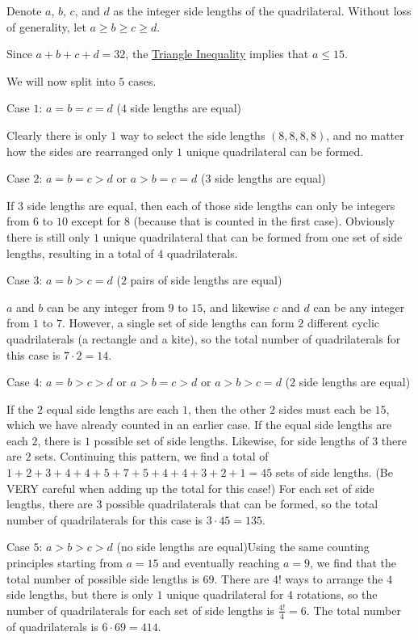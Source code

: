 \begin{enumerate}
 Denote $a$, $b$, $c$, and $d$ as the integer side lengths of the quadrilateral. Without loss of generality, let $a\ge b \ge c \ge d$.

 Since $a+b+c+d = 32$, the \href{https://artofproblemsolving.com/wiki/index.php?title=Triangle\_Inequality}{Triangle Inequality} implies that $a \le 15$.

 
We will now split into $5$ cases.

 
Case $1$: $a = b = c = d$ ($4$ side lengths are equal)

 Clearly there is only $1$ way to select the side lengths $(8,8,8,8)$, and no matter how the sides are rearranged only $1$ unique quadrilateral can be formed.

 Case $2$: $a = b = c > d$ or $a > b = c = d$ ($3$ side lengths are equal)

 If $3$ side lengths are equal, then each of those side lengths can only be integers from $6$ to $10$ except for $8$ (because that is counted in the first case). Obviously there is still only $1$ unique quadrilateral that can be formed from one set of side lengths, resulting in a total of $4$ quadrilaterals.

 Case $3$: $a = b > c = d$ ($2$ pairs of side lengths are equal)

 $a$ and $b$ can be any integer from $9$ to $15$, and likewise $c$ and $d$ can be any integer from $1$ to $7$. However, a single set of side lengths can form $2$ different cyclic quadrilaterals (a rectangle and a kite), so the total number of quadrilaterals for this case is $7\cdot{2} = 14$.

 Case $4$: $a = b > c > d$ or $a > b = c > d$ or $a > b > c = d$ ($2$ side lengths are equal)

 If the $2$ equal side lengths are each $1$, then the other $2$ sides must each be $15$, which we have already counted in an earlier case. If the equal side lengths are each $2$, there is $1$ possible set of side lengths. Likewise, for side lengths of $3$ there are $2$ sets. Continuing this pattern, we find a total of $1+2+3+4+4+5+7+5+4+4+3+2+1 = 45$ sets of side lengths. (Be VERY careful when adding up the total for this case!) For each set of side lengths, there are $3$ possible quadrilaterals that can be formed, so the total number of quadrilaterals for this case is $3\cdot{45} = 135$.

 Case $5$: $a > b > c > d$ (no side lengths are equal)Using the same counting principles starting from $a = 15$ and eventually reaching $a = 9$, we find that the total number of possible side lengths is $69$. There are $4!$ ways to arrange the $4$ side lengths, but there is only $1$ unique quadrilateral for $4$ rotations, so the number of quadrilaterals for each set of side lengths is $\frac{4!}{4} = 6$. The total number of quadrilaterals is $6\cdot{69} = 414$.


\end{enumerate}
